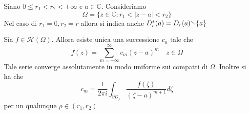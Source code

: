 Siano \(0 \le r_{1} < r_{2} < +\infty\) e \(a \in \mathbb{C}\). Consideriamo
\[
    \Omega = \{z \in \mathbb{C}: r_{1} < |z-a| < r_{2}\} 
\]
Nel caso di \(r_{1} = 0, r_{2}= r\) allora si indica anche \(D^{*}_r{(a)} =
D_r{(a)} \sminus \{a\} \) 
\begin{theorem}
    Sia \(f \in \mathcal{H}{(\Omega)}\). Allora esiste unica una successione
    \(c_{n}\) tale che 
    \[
        f{(z)} = \sum_{m=-\infty}^{\infty} c_{m} {(z-a)}^{m} \quad z \in \Omega
    \]
    Tale serie converge assolutamente in modo uniforme sui compatti di
    \(\Omega\).
    Inoltre si ha che
    \begin{equation}\label{eq:coeff-laurent}
        c_m = \frac{1}{2\pi i} \int_{\partial D_\rho} \frac{f{(\zeta)}}{{(\zeta
        - a)}^{m+1}} d \zeta
    \end{equation}
    per un qualunque \(\rho \in (r_{1}, r_{2})\) 
\end{theorem}
